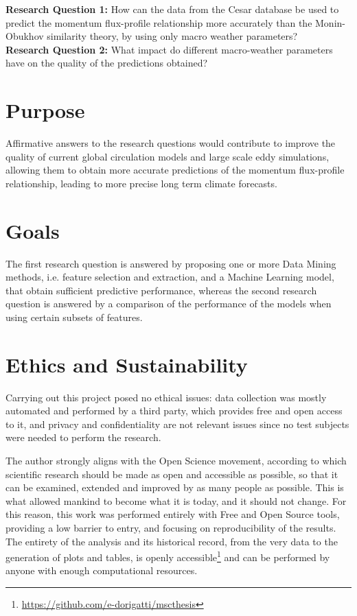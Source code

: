 \documentclass[a4paper]{book}
\begin{document}
\begin{tcolorbox}
\textbf{Research Question 1:} How can the data from the Cesar database be used to predict the momentum flux-profile relationship more accurately than the Monin-Obukhov similarity theory, by using only macro weather parameters? \\

\textbf{Research Question 2:} What impact do different macro-weather parameters have on the quality of the predictions obtained?
\end{tcolorbox}


\section{Purpose}
\label{sec:purpose}
Affirmative answers to the research questions would contribute to improve the quality of current global circulation models and large scale eddy simulations, allowing them to obtain more accurate predictions of the momentum flux-profile relationship, leading to more precise long term climate forecasts.


\section{Goals}
The first research question is answered by proposing one or more Data Mining methods, i.e. feature selection and extraction, and a Machine Learning model, that obtain sufficient predictive performance, whereas the second research question is answered by a comparison of the performance of the models when using certain subsets of features.


\section{Ethics and Sustainability}
\label{sec:ethics}
Carrying out this project posed no ethical issues: data collection was mostly automated and performed by a third party, which provides free and open access to it, and privacy and confidentiality are not relevant issues since no test subjects were needed to perform the research.

The author strongly aligns with the Open Science movement, according to which scientific research should be made as open and accessible as possible, so that it can be examined, extended and improved by as many people as possible. This is what allowed mankind to become what it is today, and it should not change. For this reason, this work was performed entirely with Free and Open Source tools, providing a low barrier to entry, and focusing on reproducibility of the results. The entirety of the analysis and its historical record, from the very data to the generation of plots and tables, is openly accessible\footnote{\url{https://github.com/e-dorigatti/mscthesis}} and can be performed by anyone with enough computational resources.
\end{document}
